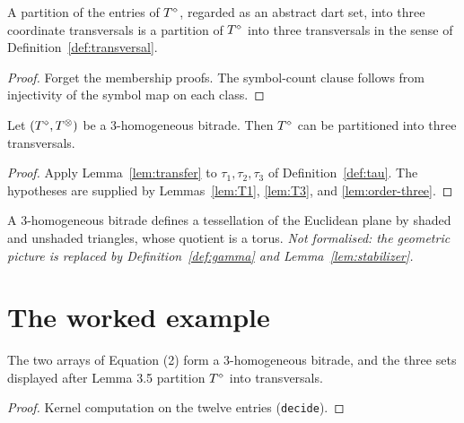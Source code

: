 \begin{lemma}\label{lem:transfer}
  \leanok
  A partition of the entries of $T^{\diamond}$, regarded as an abstract dart set,
  into three coordinate transversals is a partition of $T^{\diamond}$ into three
  transversals in the sense of Definition~\ref{def:transversal}.
\end{lemma}
\begin{proof}\leanok
  Forget the membership proofs. The symbol-count clause follows from
  injectivity of the symbol map on each class.
\end{proof}

\begin{theorem}\label{thm:main}
  \leanok
  Let $(T^{\diamond}, T^{\otimes})$ be a 3-homogeneous bitrade. Then $T^{\diamond}$ can be
  partitioned into three transversals.
\end{theorem}
\begin{proof}\leanok
  Apply Lemma~\ref{lem:transfer} to $\tau_1, \tau_2, \tau_3$ of
  Definition~\ref{def:tau}. The hypotheses are supplied by
  Lemmas~\ref{lem:T1}, \ref{lem:T3}, and \ref{lem:order-three}.
\end{proof}

\begin{lemma}\label{lem:torus}
  A 3-homogeneous bitrade defines a tessellation of the Euclidean plane by
  shaded and unshaded triangles, whose quotient is a torus.
  \emph{Not formalised: the geometric picture is replaced by
  Definition~\ref{def:gamma} and Lemma~\ref{lem:stabilizer}.}
\end{lemma}

\chapter{The worked example}

\begin{proposition}\label{prop:example}
  \leanok
  The two arrays of Equation (2) form a 3-homogeneous bitrade, and the
  three sets displayed after Lemma 3.5 partition $T^{\diamond}$ into
  transversals.
\end{proposition}
\begin{proof}\leanok
  Kernel computation on the twelve entries (\texttt{decide}).
\end{proof}

